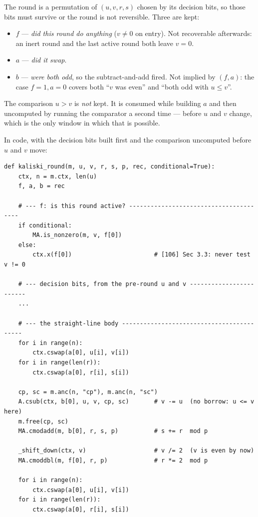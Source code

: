 \documentclass[11pt]{article}
\theoremstyle{plain}
\theoremstyle{remark}
\begin{document}
\begin{keybox}[title={Three bits per round, and why none can be dropped}]
The round is a permutation of $(u,v,r,s)$ chosen by its decision bits, so those bits must survive
or the round is not reversible. Three are kept:
\begin{itemize}\setlength\itemsep{1pt}
\item $f$ --- \emph{did this round do anything} ($v\neq0$ on entry). Not recoverable afterwards: an
inert round and the last active round both leave $v=0$.
\item $a$ --- \emph{did it swap}.
\item $b$ --- \emph{were both odd}, so the subtract-and-add fired. Not implied by $(f,a)$: the case
$f=1,a=0$ covers both ``$v$ was even'' and ``both odd with $u\le v$''.
\end{itemize}
The comparison $u>v$ is \emph{not} kept. It is consumed while building $a$ and then uncomputed by
running the comparator a second time --- before $u$ and $v$ change, which is the only window in
which that is possible.
\end{keybox}

\noindent
In code, with the decision bits built first and the comparison uncomputed before $u$ and $v$ move:

\begin{lstlisting}
def kaliski_round(m, u, v, r, s, p, rec, conditional=True):
    ctx, n = m.ctx, len(u)
    f, a, b = rec

    # --- f: is this round active? ---------------------------------------
    if conditional:
        MA.is_nonzero(m, v, f[0])
    else:
        ctx.x(f[0])                       # [106] Sec 3.3: never test v != 0

    # --- decision bits, from the pre-round u and v ------------------------
    ...

    # --- the straight-line body ------------------------------------------
    for i in range(n):
        ctx.cswap(a[0], u[i], v[i])
    for i in range(len(r)):
        ctx.cswap(a[0], r[i], s[i])

    cp, sc = m.anc(n, "cp"), m.anc(n, "sc")
    A.csub(ctx, b[0], u, v, cp, sc)       # v -= u  (no borrow: u <= v here)
    m.free(cp, sc)
    MA.cmodadd(m, b[0], r, s, p)          # s += r  mod p

    _shift_down(ctx, v)                   # v /= 2  (v is even by now)
    MA.cmoddbl(m, f[0], r, p)             # r *= 2  mod p

    for i in range(n):
        ctx.cswap(a[0], u[i], v[i])
    for i in range(len(r)):
        ctx.cswap(a[0], r[i], s[i])
\end{lstlisting}
\end{document}

